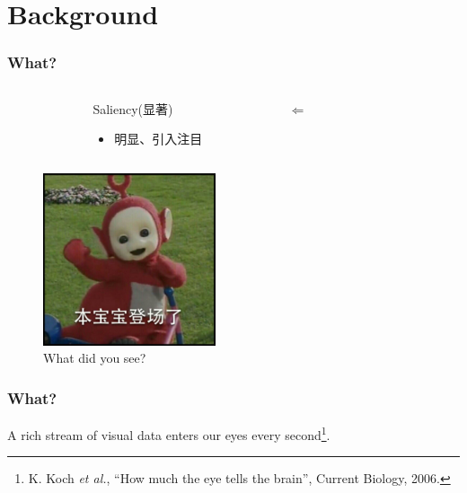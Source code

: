 \documentclass[notheorems,serif,table,compress]{beamer}  %
\begin{document}
\section{Background}



\begin{frame}[fragile]
\frametitle{What?}
\begin{columns}
\begin{column}{\leftmargini}
\end{column}
\begin{column}{0.5\linewidth}
Saliency(显著)

\begin{itemize}
\item 明显、引入注目
\end{itemize}
\end{column}
\pause
\begin{column}{0.16\linewidth}
\huge $\Longleftarrow$ 
\end{column}
\pause
\begin{column}{0.3\linewidth}
 \centering{\color{blue}{Visual Attention}}
\end{column}
\end{columns}\vspace{1ex}


\begin{figure}
  \centering
\includegraphics[width=2in]{tianxianbaobao.jpg}
  \caption{What did you see?}
 \label{tianxianbaobao}
  \end{figure}
\end{frame}

\begin{frame}
\frametitle{What?}
  A rich stream of visual data enters our eyes every second\footnote{K. Koch \textit{et al.}, ``How much the eye tells the brain'', Current Biology, 2006. }.\newline
  
  \pause
  \centering{\Huge \color{blue}{$10^8 \sim 10^9 bits$}}
\end{frame}
  
\end{document}
